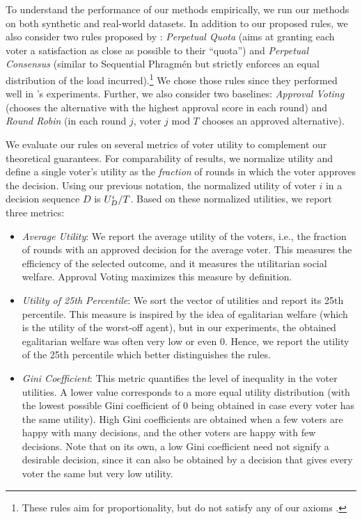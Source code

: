 \documentclass[10pt]{scrartcl}
\theoremstyle{plain}
\theoremstyle{definition}
\begin{document}
To understand the performance of our methods empirically, we run our methods on both synthetic and real-world datasets. 
In addition to our proposed rules, we also consider two rules proposed by \citet{lackner2020perpetual}: \emph{Perpetual Quota} (aims at granting each voter a satisfaction as close as possible to their ``quota'') and \emph{Perpetual Consensus} (similar to  Sequential Phragm\'en but strictly enforces an equal distribution of the load incurred).\footnote{These rules aim for proportionality, but do not satisfy any of our axioms \citep{lacknermaly2023}.}
We chose those rules since they performed well in \citeauthor{lackner2020perpetual}'s \citeyearpar{lackner2020perpetual} experiments.
Further, we also consider two baselines: \emph{Approval Voting} (chooses the alternative with the highest approval score in each round) and \emph{Round Robin} (in each round $j$, voter $j \text{ mod } T$ chooses an approved alternative).

We evaluate our rules on several metrics of voter utility to complement our theoretical guarantees. For comparability of results, we normalize utility and define a single voter's utility as the \emph{fraction} of rounds in which the voter approves the decision. Using our previous notation, the normalized utility of voter $i$ in a decision sequence $D$ is $\smash{U^i_D}/T$. Based on these normalized utilities, we report three metrics:
\begin{itemize}[leftmargin=15pt]
	\item \emph{Average Utility}: We report the average utility of the voters, i.e., the fraction of rounds with an approved decision for the average voter. This measures the efficiency of the selected outcome, and it measures the utilitarian social welfare. Approval Voting maximizes this measure by definition.
	\item \emph{Utility of 25th Percentile}: We sort the vector of utilities and report its 25th percentile. This measure is inspired by the idea of egalitarian welfare (which is the utility of the worst-off agent), but in our experiments, the obtained egalitarian welfare was often very low or even 0. Hence, we report the utility of the 25th percentile which better distinguishes the rules.
	\item \emph{Gini Coefficient}: This metric quantifies the level of inequality in the voter utilities. A lower value corresponds to a more equal utility distribution (with the lowest possible Gini coefficient of 0 being obtained in case every voter has the same utility). High Gini coefficients are obtained when a few voters are happy with many decisions, and the other voters are happy with few decisions. Note that on its own, a low Gini coefficient need not signify a desirable decision, since it can also be obtained by a decision that gives every voter the same but very low utility.
\end{itemize}
\end{document}
